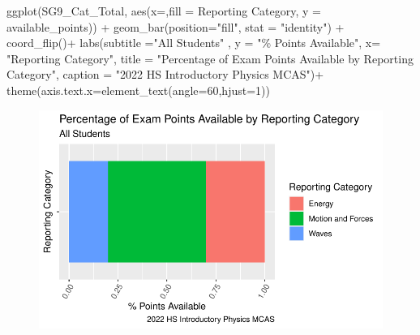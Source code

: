\documentclass[
  letterpaper,
  DIV=11,
  numbers=noendperiod]{scrartcl}
\newenvironment{Shaded}{\begin{snugshade}}{\end{snugshade}}
\newcommand{\AttributeTok}[1]{\textcolor[rgb]{0.40,0.45,0.13}{#1}}
\newcommand{\DecValTok}[1]{\textcolor[rgb]{0.68,0.00,0.00}{#1}}
\newcommand{\FunctionTok}[1]{\textcolor[rgb]{0.28,0.35,0.67}{#1}}
\newcommand{\NormalTok}[1]{\textcolor[rgb]{0.00,0.23,0.31}{#1}}
\newcommand{\SpecialCharTok}[1]{\textcolor[rgb]{0.37,0.37,0.37}{#1}}
\newcommand{\StringTok}[1]{\textcolor[rgb]{0.13,0.47,0.30}{#1}}
\begin{document}
\begin{Shaded}
\begin{Highlighting}[]
\FunctionTok{ggplot}\NormalTok{(SG9\_Cat\_Total, }\FunctionTok{aes}\NormalTok{(}\AttributeTok{x=}\StringTok{\textquotesingle{}\textquotesingle{}}\NormalTok{,}\AttributeTok{fill =} \StringTok{\textasciigrave{}}\AttributeTok{Reporting Category}\StringTok{\textasciigrave{}}\NormalTok{, }\AttributeTok{y =} \StringTok{\textasciigrave{}}\AttributeTok{available\_points}\StringTok{\textasciigrave{}}\NormalTok{)) }\SpecialCharTok{+}
    \FunctionTok{geom\_bar}\NormalTok{(}\AttributeTok{position=}\StringTok{"fill"}\NormalTok{, }\AttributeTok{stat =} \StringTok{"identity"}\NormalTok{) }\SpecialCharTok{+} \FunctionTok{coord\_flip}\NormalTok{()}\SpecialCharTok{+}
 \FunctionTok{labs}\NormalTok{(}\AttributeTok{subtitle =}\StringTok{"All Students"}\NormalTok{ ,}
       \AttributeTok{y =} \StringTok{"\% Points Available"}\NormalTok{,}
       \AttributeTok{x=} \StringTok{"Reporting Category"}\NormalTok{,}
       \AttributeTok{title =} \StringTok{"Percentage of Exam Points Available by Reporting Category"}\NormalTok{,}
      \AttributeTok{caption =} \StringTok{"2022 HS Introductory Physics MCAS"}\NormalTok{)}\SpecialCharTok{+}
       \FunctionTok{theme}\NormalTok{(}\AttributeTok{axis.text.x=}\FunctionTok{element\_text}\NormalTok{(}\AttributeTok{angle=}\DecValTok{60}\NormalTok{,}\AttributeTok{hjust=}\DecValTok{1}\NormalTok{))}
\end{Highlighting}
\end{Shaded}

\begin{figure}[H]

{\centering \includegraphics{theresaSzczepanski_final_files/figure-pdf/unnamed-chunk-13-1.pdf}

}

\end{figure}
\end{document}
